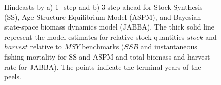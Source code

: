 \documentclass[12pt,halfline,a4paper,nonumbib]{ouparticle}
\begin{document}
\begin{figure}


\caption{Hindcasts by a) 1 -step and b) 3-step ahead for Stock Synthesis (SS),  Age-Structure Equilibrium Model (ASPM), and Bayesian state-space biomass dynamics model (JABBA).  The thick solid line represent the model estimates for relative stock quantities $stock$ and $harvest$ relative to $MSY$ benchmarks ($SSB$ and instantaneous fishing mortality for SS and ASPM and total biomass and harvest rate for JABBA). The points indicate the terminal years of the peels.}\label{fig:retro}
\end{figure}
\end{document}
